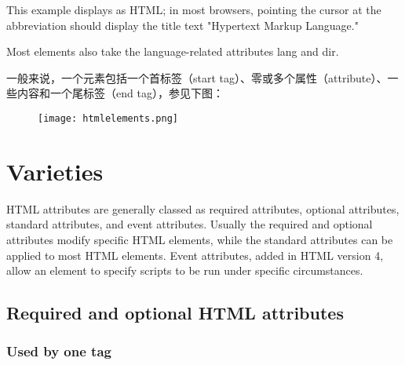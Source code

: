 This example displays as HTML; in most browsers, pointing the cursor at the abbreviation should display the title text "Hypertext Markup Language."


Most elements also take the language-related attributes lang and dir.

一般来说，一个元素包括一个首标签（start tag）、零或多个属性（attribute）、一些内容和一个尾标签（end tag），参见下图：

\begin{figure}[!h]
\centering
\texttt{[image: htmlelements.png]}
\end{figure}



\chapter{Varieties}


HTML attributes are generally classed as required attributes, optional attributes, standard attributes, and event attributes. Usually the required and optional attributes modify specific HTML elements, while the standard attributes can be applied to most HTML elements. Event attributes, added in HTML version 4, allow an element to specify scripts to be run under specific circumstances.



\section{Required and optional HTML attributes}


\subsection{Used by one tag}


